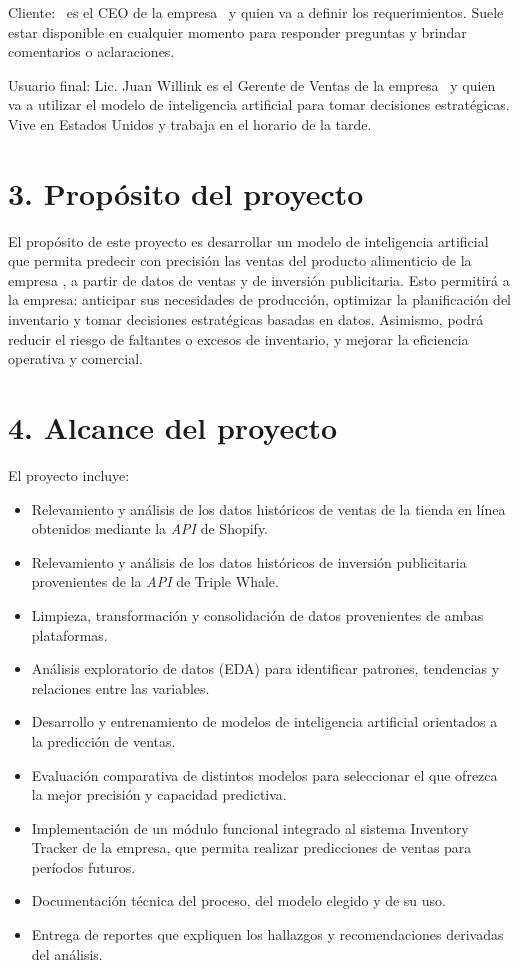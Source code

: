 \documentclass[
11pt, %
]{charter}
\begin{document}
Cliente: \clientename\ es el CEO de la empresa \empclientename\ y quien va a definir los requerimientos. Suele estar disponible en cualquier momento para responder preguntas  y brindar comentarios o aclaraciones.

Usuario final: Lic. Juan Willink es el Gerente de Ventas de la empresa \empclientename\ y quien va a utilizar el modelo de inteligencia artificial para tomar decisiones estratégicas. 
Vive en Estados Unidos y trabaja en el horario de la tarde.


\section{3. Propósito del proyecto}
\label{sec:proposito}

El propósito de este proyecto es desarrollar un modelo de inteligencia artificial que permita predecir con precisión las ventas del producto alimenticio de la empresa \empclientename, 
a partir de datos de ventas y de inversión publicitaria. 
Esto permitirá a la empresa: anticipar sus necesidades de producción, optimizar la planificación del inventario y tomar decisiones estratégicas basadas en datos. 
Asimismo, podrá reducir el riesgo de faltantes o excesos de inventario, y mejorar la eficiencia operativa y comercial.

\section{4. Alcance del proyecto}
\label{sec:alcance}

El proyecto incluye:
\begin{itemize}
\item Relevamiento y análisis de los datos históricos de ventas de la tienda en línea obtenidos mediante la \textit{API} de Shopify.
\item Relevamiento y análisis de los datos históricos de inversión publicitaria provenientes de la \textit{API} de Triple Whale.
\item Limpieza, transformación y consolidación de datos provenientes de ambas plataformas.
\item Análisis exploratorio de datos (EDA) para identificar patrones, tendencias y relaciones entre las variables.
\item Desarrollo y entrenamiento de modelos de inteligencia artificial orientados a la predicción de ventas.
\item Evaluación comparativa de distintos modelos para seleccionar el que ofrezca la mejor precisión y capacidad predictiva.
\item Implementación de un módulo funcional integrado al sistema Inventory Tracker de la empresa, que permita realizar predicciones de ventas para períodos futuros.
\item Documentación técnica del proceso, del modelo elegido y de su uso.
\item Entrega de reportes que expliquen los hallazgos y recomendaciones derivadas del análisis.
\end{itemize}
\end{document}
